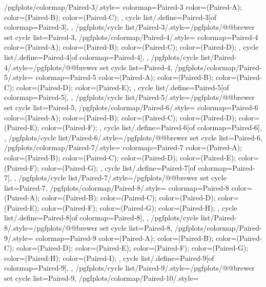 {  %
  /pgfplots/colormap/Paired-3/.style={
    colormap={Paired-3}{
      color=(Paired-A);
      color=(Paired-B);
      color=(Paired-C);
    },
    cycle list/.define={Paired-3}{[of colormap=Paired-3]},
  },
  /pgfplots/cycle list/Paired-3/.style={/pgfplots/@@brewer set cycle list={Paired-3}},
  /pgfplots/colormap/Paired-4/.style={
    colormap={Paired-4}{
      color=(Paired-A);
      color=(Paired-B);
      color=(Paired-C);
      color=(Paired-D);
    },
    cycle list/.define={Paired-4}{[of colormap=Paired-4]},
  },
  /pgfplots/cycle list/Paired-4/.style={/pgfplots/@@brewer set cycle list={Paired-4}},
  /pgfplots/colormap/Paired-5/.style={
    colormap={Paired-5}{
      color=(Paired-A);
      color=(Paired-B);
      color=(Paired-C);
      color=(Paired-D);
      color=(Paired-E);
    },
    cycle list/.define={Paired-5}{[of colormap=Paired-5]},
  },
  /pgfplots/cycle list/Paired-5/.style={/pgfplots/@@brewer set cycle list={Paired-5}},
  /pgfplots/colormap/Paired-6/.style={
    colormap={Paired-6}{
      color=(Paired-A);
      color=(Paired-B);
      color=(Paired-C);
      color=(Paired-D);
      color=(Paired-E);
      color=(Paired-F);
    },
    cycle list/.define={Paired-6}{[of colormap=Paired-6]},
  },
  /pgfplots/cycle list/Paired-6/.style={/pgfplots/@@brewer set cycle list={Paired-6}},
  /pgfplots/colormap/Paired-7/.style={
    colormap={Paired-7}{
      color=(Paired-A);
      color=(Paired-B);
      color=(Paired-C);
      color=(Paired-D);
      color=(Paired-E);
      color=(Paired-F);
      color=(Paired-G);
    },
    cycle list/.define={Paired-7}{[of colormap=Paired-7]},
  },
  /pgfplots/cycle list/Paired-7/.style={/pgfplots/@@brewer set cycle list={Paired-7}},
  /pgfplots/colormap/Paired-8/.style={
    colormap={Paired-8}{
      color=(Paired-A);
      color=(Paired-B);
      color=(Paired-C);
      color=(Paired-D);
      color=(Paired-E);
      color=(Paired-F);
      color=(Paired-G);
      color=(Paired-H);
    },
    cycle list/.define={Paired-8}{[of colormap=Paired-8]},
  },
  /pgfplots/cycle list/Paired-8/.style={/pgfplots/@@brewer set cycle list={Paired-8}},
  /pgfplots/colormap/Paired-9/.style={
    colormap={Paired-9}{
      color=(Paired-A);
      color=(Paired-B);
      color=(Paired-C);
      color=(Paired-D);
      color=(Paired-E);
      color=(Paired-F);
      color=(Paired-G);
      color=(Paired-H);
      color=(Paired-I);
    },
    cycle list/.define={Paired-9}{[of colormap=Paired-9]},
  },
  /pgfplots/cycle list/Paired-9/.style={/pgfplots/@@brewer set cycle list={Paired-9}},
  /pgfplots/colormap/Paired-10/.style={
}}
